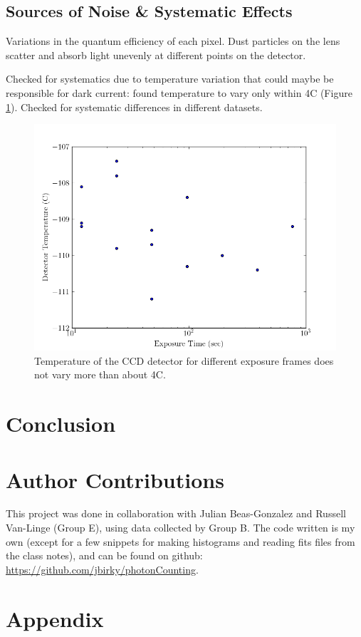 \documentclass[preprint]{aastex62}
\begin{document}
\subsection{Sources of Noise \& Systematic Effects}
Variations in the quantum efficiency of each pixel.
Dust particles on the lens scatter and absorb light unevenly at different points on the detector.

Checked for systematics due to temperature variation that could maybe be responsible for dark current: found temperature to vary only within 4C (Figure \ref{fig:temp}). Checked for systematic differences in different datasets. 

\begin{figure}[ht]
\begin{center}
\includegraphics[width=.48\linewidth]{plots/exposure_temp.png}
\caption{Temperature of the CCD detector for different exposure frames does not vary more than about 4C.} \label{fig:temp}
\end{center}
\end{figure}

\section{Conclusion}

\section{Author Contributions}

This project was done in collaboration with Julian Beas-Gonzalez and Russell Van-Linge (Group E), using data collected by Group B. The code written is my own (except for a few snippets for making histograms and reading fits files from the class notes), and can be found on github: \href{https://github.com/jbirky/photonCounting}{https://github.com/jbirky/photonCounting}.

\section{Appendix}
\end{document}
